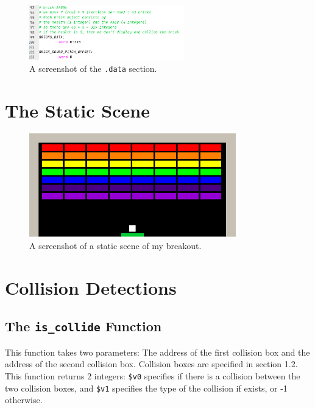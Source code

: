 \documentclass{article}
\newcommand{\code}[1]{\texttt{#1}}
\begin{document}
\begin{figure}[h!]
    \centering
    \includegraphics[width=0.6\textwidth]{memory_3.png}
    \caption{A screenshot of the \code{.data} section.}
\end{figure}

\newpage

\section{The Static Scene}

\begin{figure}[h!]
    \centering
    \includegraphics[width=0.8\textwidth]{static_scene_0.png}
    \caption{A screenshot of a static scene of my breakout.}
\end{figure}

\newpage

\section{Collision Detections}

\subsection{The \code{is\_collide} Function}

This function takes two parameters: The address of the first collision box and the address of the second collision box. Collision boxes are specified in section 1.2. This function returns 2 integers: \code{\$v0} specifies if there is a collision between the two collision boxes, and \code{\$v1} specifies the type of the collision if exists, or -1 otherwise.
\end{document}
